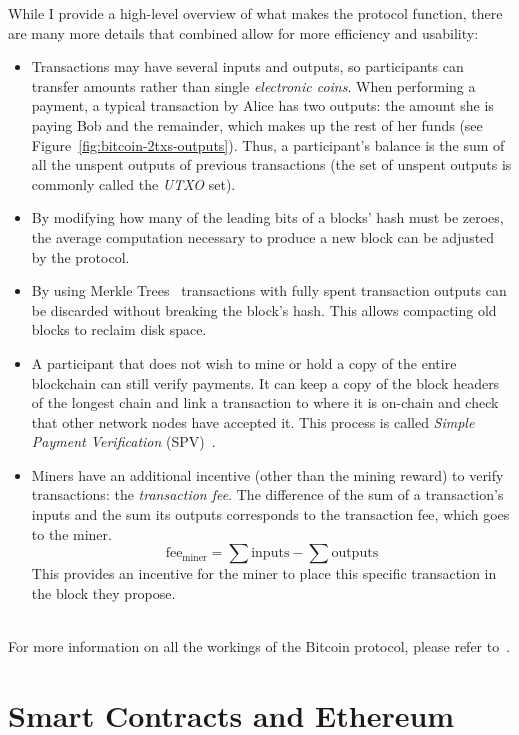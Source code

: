While I provide a high-level overview of what makes the protocol function, there are many more details that combined
allow for more efficiency and usability:
\begin{itemize}
    \item Transactions may have several inputs and outputs, so participants can transfer amounts rather than single
    \textit{electronic coins}.
    When performing a payment, a typical transaction by Alice has two outputs: the amount she is paying Bob and the
    remainder, which makes up the rest of her funds (see Figure~\ref{fig:bitcoin-2txs-outputs}).
    Thus, a participant's balance is the sum of all the unspent outputs of previous transactions (the set of unspent
    outputs is commonly called the \textit{UTXO} set).
    \item By modifying how many of the leading bits of a blocks' hash must be zeroes, the average computation necessary
    to produce a new block can be adjusted by the protocol.
    \item By using Merkle Trees~\cite{merkle1980tree} transactions with fully spent transaction outputs can be discarded
    without breaking the block's hash.
    This allows compacting old blocks to reclaim disk space.
    \item A participant that does not wish to mine or hold a copy of the entire blockchain can still verify payments.
    It can keep a copy of the block headers of the longest chain and link a transaction to where it is on-chain and
    check that other network nodes have accepted it.
    This process is called \textit{Simple Payment Verification} (SPV)~\cite{nakamoto2008bitcoin}.
    \item Miners have an additional incentive (other than the mining reward) to verify transactions: the
    \textit{transaction fee}.
    The difference of the sum of a transaction's inputs and the sum its outputs corresponds to the transaction fee, which
    goes to the miner.
    \[
        \text{fee}_\text{miner} = \sum{\text{inputs}} - \sum{\text{outputs}}
    \]
    This provides an incentive for the miner to place this specific transaction in the block they propose.
\end{itemize}
\\

For more information on all the workings of the Bitcoin protocol, please refer to~\cite{nakamoto2008bitcoin}.


\section{Smart Contracts and Ethereum}\label{sec:ethereum}

